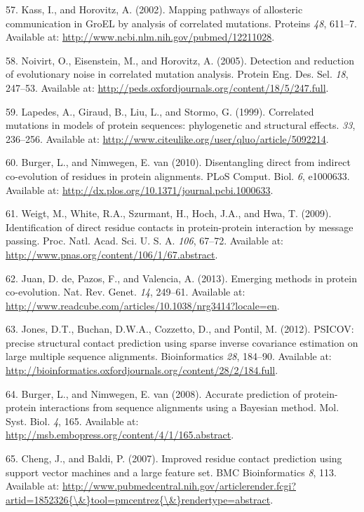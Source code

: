 \documentclass[11pt,a4paper,twoside]{book}
\theoremstyle{definition}
\theoremstyle{definition}
\theoremstyle{remark}
\begin{document}
\hypertarget{ref-Kass2002}{}
57. Kass, I., and Horovitz, A. (2002). Mapping pathways of allosteric
communication in GroEL by analysis of correlated mutations. Proteins
\emph{48}, 611--7. Available at:
\url{http://www.ncbi.nlm.nih.gov/pubmed/12211028}.

\hypertarget{ref-Noivirt2005}{}
58. Noivirt, O., Eisenstein, M., and Horovitz, A. (2005). Detection and
reduction of evolutionary noise in correlated mutation analysis. Protein
Eng. Des. Sel. \emph{18}, 247--53. Available at:
\url{http://peds.oxfordjournals.org/content/18/5/247.full}.

\hypertarget{ref-Lapedes1999}{}
59. Lapedes, A., Giraud, B., Liu, L., and Stormo, G. (1999). Correlated
mutations in models of protein sequences: phylogenetic and structural
effects. \emph{33}, 236--256. Available at:
\url{http://www.citeulike.org/user/qluo/article/5092214}.

\hypertarget{ref-Burger2010}{}
60. Burger, L., and Nimwegen, E. van (2010). Disentangling direct from
indirect co-evolution of residues in protein alignments. PLoS Comput.
Biol. \emph{6}, e1000633. Available at:
\url{http://dx.plos.org/10.1371/journal.pcbi.1000633}.

\hypertarget{ref-Weigt2009}{}
61. Weigt, M., White, R.A., Szurmant, H., Hoch, J.A., and Hwa, T.
(2009). Identification of direct residue contacts in protein-protein
interaction by message passing. Proc. Natl. Acad. Sci. U. S. A.
\emph{106}, 67--72. Available at:
\url{http://www.pnas.org/content/106/1/67.abstract}.

\hypertarget{ref-DeJuan2013}{}
62. Juan, D. de, Pazos, F., and Valencia, A. (2013). Emerging methods in
protein co-evolution. Nat. Rev. Genet. \emph{14}, 249--61. Available at:
\url{http://www.readcube.com/articles/10.1038/nrg3414?locale=en}.

\hypertarget{ref-Jones2012}{}
63. Jones, D.T., Buchan, D.W.A., Cozzetto, D., and Pontil, M. (2012).
PSICOV: precise structural contact prediction using sparse inverse
covariance estimation on large multiple sequence alignments.
Bioinformatics \emph{28}, 184--90. Available at:
\url{http://bioinformatics.oxfordjournals.org/content/28/2/184.full}.

\hypertarget{ref-Burger2008}{}
64. Burger, L., and Nimwegen, E. van (2008). Accurate prediction of
protein-protein interactions from sequence alignments using a Bayesian
method. Mol. Syst. Biol. \emph{4}, 165. Available at:
\url{http://msb.embopress.org/content/4/1/165.abstract}.

\hypertarget{ref-Cheng2007}{}
65. Cheng, J., and Baldi, P. (2007). Improved residue contact prediction
using support vector machines and a large feature set. BMC
Bioinformatics \emph{8}, 113. Available at:
\href{http://www.pubmedcentral.nih.gov/articlerender.fcgi?artid=1852326\%7B/\&\%7Dtool=pmcentrez\%7B/\&\%7Drendertype=abstract}{http://www.pubmedcentral.nih.gov/articlerender.fcgi?artid=1852326\{\textbackslash{}\&\}tool=pmcentrez\{\textbackslash{}\&\}rendertype=abstract}.
\end{document}
